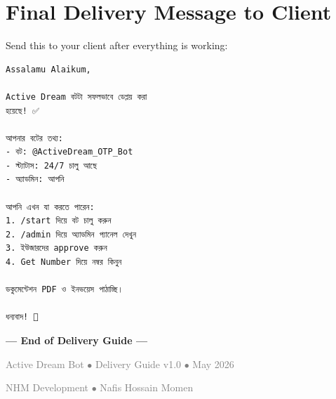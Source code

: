\section{Final Delivery Message to Client}

Send this to your client after everything is working:

\begin{lstlisting}[style=envstyle, title={Final Delivery Message (Bangla)}]
Assalamu Alaikum,

Active Dream বটটা সফলভাবে ডেপ্লয় করা 
হয়েছে! ✅

আপনার বটের তথ্য:
- বট: @ActiveDream_OTP_Bot
- স্ট্যাটাস: 24/7 চালু আছে
- অ্যাডমিন: আপনি

আপনি এখন যা করতে পারেন:
1. /start দিয়ে বট চালু করুন
2. /admin দিয়ে অ্যাডমিন প্যানেল দেখুন
3. ইউজারদের approve করুন
4. Get Number দিয়ে নম্বর কিনুন

ডকুমেন্টেশন PDF ও ইনভয়েস পাঠাচ্ছি।

ধন্যবাদ! 🙏
\end{lstlisting}

\vspace{1cm}

\begin{center}
\Large\textbf{--- End of Delivery Guide ---}

\vspace{0.5cm}
\normalsize
\textcolor{gray}{Active Dream Bot $\bullet$ Delivery Guide v1.0 $\bullet$ May 2026}

\textcolor{gray}{NHM Development $\bullet$ Nafis Hossain Momen}
\end{center}
